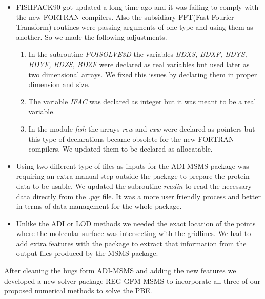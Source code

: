 \begin{itemize}
	\item FISHPACK90 got updated a long time ago and it was failing to comply with the new FORTRAN compilers. Also the subsidiary FFT(Fast Fourier Transform) routines were passing arguments of one type and using them as another. So we made the following adjustments.
		\begin{enumerate}
			\item In the subroutine {\it POISOLVE3D} the variables {\it BDXS, BDXF, BDYS, BDYF, BDZS, BDZF} were declared as real variables but used later as two dimensional arrays. We fixed this issues by declaring them in proper dimension and size.
			\item The variable {\it IFAC} was declared as integer but it was meant to be a real variable.
			\item In the module {\it fish} the arrays {\it rew} and {\it cxw} were declared as pointers but this type of declarations became obsolete for the new FORTRAN compilers. We updated them to be declared as allocatable.  
		\end{enumerate}
	\item Using two different type of files as inputs for the ADI-MSMS package was requiring an extra manual step outside the package to prepare the protein data to be usable. We updated the subroutine {\it readin} to read the necessary data directly from the {\it .pqr} file. It was a more user friendly process and better in terms of data management for the whole package.
	\item Unlike the ADI or LOD methods we needed the exact location of the points where the molecular surface was intersecting with the gridlines. We had to add extra features with the package to extract that information from the output files produced by the MSMS package.     
\end{itemize}  

After cleaning the bugs form ADI-MSMS and adding the new features we developed a new solver package REG-GFM-MSMS to incorporate all three of our proposed numerical methods to solve the PBE. 


